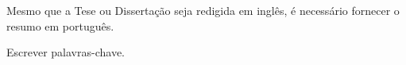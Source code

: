 \resumo

Mesmo que a Tese ou Dissertação seja redigida em inglês, é necessário fornecer o resumo em português.

\begin{keywords}
Escrever palavras-chave.
\end{keywords}